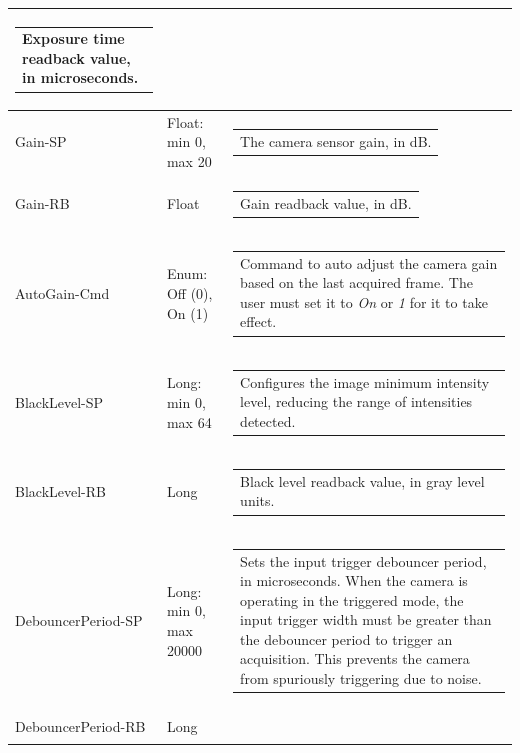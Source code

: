 \documentclass[openany]{article}
\begin{document}
\begin{longtable}{| m{3.0cm} m{4.5cm}  m{7.0cm} |}
\begin{tabular}{@{}m{6cm}@{}}
                Exposure time readback value, in microseconds.
            \end{tabular} \hypertarget{pv:gain}{}\\ \hline
        Gain-SP & Float: min 0, max 20 & \begin{tabular}{@{}m{6cm}@{}}
                The camera sensor gain, in dB.
            \end{tabular} \\ \hline
        Gain-RB & Float & \begin{tabular}{@{}m{6cm}@{}}
                Gain readback value, in dB.
            \end{tabular} \hypertarget{pv:auto-gain}{}\\ \hline
        AutoGain-Cmd & Enum: Off (0), On (1) & \begin{tabular}{@{}m{6cm}@{}}
                Command to auto adjust the camera gain based on the last acquired frame. The user must set it to \emph{On} or \emph{1} for it to take effect.
            \end{tabular} \hypertarget{pv:black-level}{}\\ \hline
        BlackLevel-SP & Long: min 0, max 64 & \begin{tabular}{@{}m{6cm}@{}}
                Configures the image minimum intensity level, reducing the
                range of intensities detected.
            \end{tabular} \\ \hline
        BlackLevel-RB & Long & \begin{tabular}{@{}m{6cm}@{}}
                Black level readback value, in gray level units.
            \end{tabular} \hypertarget{pv:debouncer-period}{}\\ \hline
        DebouncerPeriod-SP & Long: min 0, max 20000 & \begin{tabular}{@{}m{6cm}@{}}
                Sets the input trigger debouncer period, in microseconds.
                When the camera is operating in the triggered mode, the input trigger 
                width must be greater than the debouncer period to trigger an acquisition.
                This prevents the camera from spuriously triggering due to noise.
            \end{tabular} \\ \hline
        DebouncerPeriod-RB & Long & \begin{tabular}{@{}m{6cm}@{}}

\end{tabular}
\end{longtable}
\end{document}
